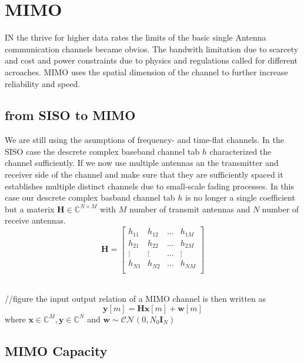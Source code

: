 \section{MIMO}
IN the thrive for higher data rates the limits of the basic single Antenna communication channels became obvios. The bandwith limitation due to scarcety and cost and power constraints due to physics and regulations called for different acroaches. MIMO uses the spatial dimension of the channel to further increase reliability and speed.

\subsection{from SISO to MIMO}
We are still using the asumptions of frequency- and time-flat channels. In the SISO case the descrete complex baseband channel tab $h$ characterized the channel sufficiently. If we now use multiple antennas an the transmitter and receiver side of the channel and make sure that they are sufficiently spaced it establishes multiple distinct channels due to small-scale fading processes. In this case our descrete complex basband channel tab $h$ is no longer a single coefficient but a materix $\mathbf{H}\in\mathbb{C}^{N\times M}$ with $M$ number of transmit antennas and $N$ number of receive antennas. 
\begin{equation}
	\mathbf{H} = \begin{bmatrix}
		h_{11} & h_{12} & \hdots & h_{1M} \\
		h_{21} & h_{22} & \hdots & h_{2M} \\
		\vdots & \vdots & \hdots & \vdots \\
		h_{N1} & h_{N2} & \hdots & h_{NM} \\
	\end{bmatrix}
\end{equation}

\\
//figure
the input output relation of a MIMO channel is then written as 
\begin{equation}
\mathbf{y}[m] = \mathbf{Hx}[m] + \mathbf{w}[m]
\end{equation}
where $\mathbf{x}\in\mathbb{C}^M , \mathbf{y}\in\mathbb{C}^N$ and $\mathbf{w}\sim\mathcal{CN}(0,N_0\mathbf{I}_N)$

\subsection{MIMO Capacity}


